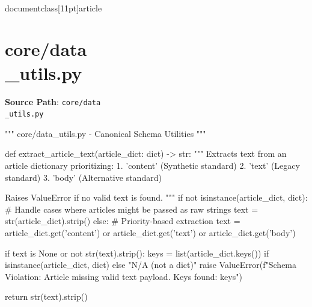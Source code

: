 \\documentclass[11pt]{article}
\begin{document}
\section*{core/data\\_utils.py}
\textbf{Source Path}: \texttt{core/data\\_utils.py}\par
\bigskip
\begin{CodeBlock}
"""
core/data_utils.py - Canonical Schema Utilities
"""

def extract_article_text(article_dict: dict) -> str:
    """
    Extracts text from an article dictionary prioritizing:
    1. 'content' (Synthetic standard)
    2. 'text' (Legacy standard)
    3. 'body' (Alternative standard)
    
    Raises ValueError if no valid text is found.
    """
    if not isinstance(article_dict, dict):
        # Handle cases where articles might be passed as raw strings
        text = str(article_dict).strip()
    else:
        # Priority-based extraction
        text = article_dict.get('content') or article_dict.get('text') or article_dict.get('body')
    
    if text is None or not str(text).strip():
        keys = list(article_dict.keys()) if isinstance(article_dict, dict) else "N/A (not a dict)"
        raise ValueError(f"Schema Violation: Article missing valid text payload. Keys found: {keys}")
        
    return str(text).strip()

\end{CodeBlock}
\end{document}
